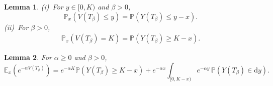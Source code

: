 \documentclass[reqno,12pt]{amsart}
\newtheorem{lemma}{Lemma}
\begin{document}

\begin{lemma}\label{lemma: dist W Levy sub init x}
    {\rm (i)}~For $y\in[0,K)$ and $\beta>0$,
    \begin{equation*}
        \mathbb{P}_x\left(V(T_\beta) \leqslant y\right) = \mathbb{P}\left(Y(T_\beta) \leqslant y-x\right).
    \end{equation*}
    {\rm (ii)}~For $\beta>0$,  \begin{align*}
        \mathbb{P}_x(V(T_\beta) = K) = \mathbb{P}\left(Y(T_\beta) \geqslant K-x\right).
    \end{align*}
\end{lemma}
\begin{lemma}\label{lemma: LST sub init x}
    For $\alpha\geqslant0$ and $\beta >0$,
    \begin{equation*}
        \mathbb{E}_x\left(e^{-\alpha V(T_\beta)}\right) = e^{-\alpha K}\mathbb{P}\left(Y(T_\beta) \geqslant K-x\right) + e^{-\alpha x}\int_{[0,K-x)} e^{-\alpha y}\,\mathbb{P}\left(Y(T_\beta) \in \mathrm{d}y\right).
    \end{equation*}
\end{lemma}
\end{document}
